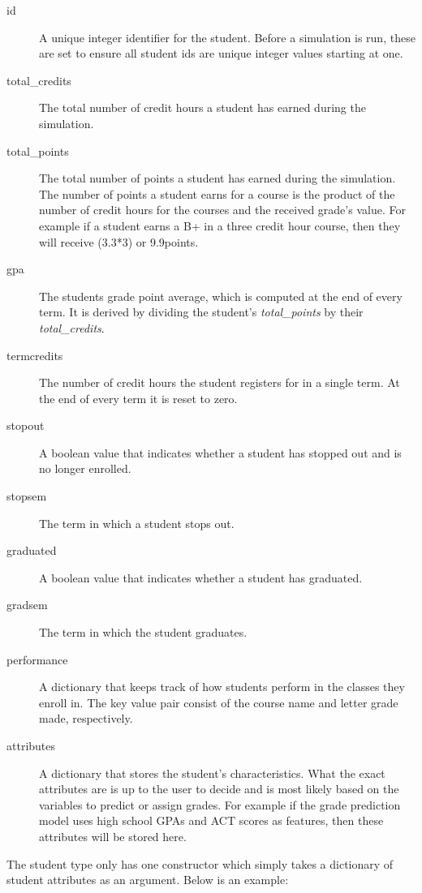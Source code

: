 \documentclass[botnum, fleqn]{unmeethesis}
\begin{document}
    \begin{description}
      \item [id] A unique integer identifier for the student. Before a simulation is run, these are set to ensure all student ids are unique integer values starting at one.
      \item [total\_credits] The total number of credit hours a student has earned during the simulation.
      \item [total\_points] The total number of points a student has earned during the simulation. The number of points a student earns for a course is the product of the number of credit hours for the courses and the received grade's value. For example if a student earns a B+ in a three credit hour course, then they will receive (3.3*3) or 9.9points.
      \item [gpa] The students grade point average, which is computed at the end of every term. It is derived by dividing the student's \textit{total\_points} by their \textit{total\_credits}.
      \item [termcredits] The number of credit hours the student registers for in a single term. At the end of every term it is reset to zero.
      \item [stopout] A boolean value that indicates whether a student has stopped out and is no longer enrolled.
      \item [stopsem] The term in which a student stops out.
      \item [graduated] A boolean value that indicates whether a student has graduated.
      \item [gradsem] The term in which the student graduates.
      \item [performance] A dictionary that keeps track of how students perform in the classes they enroll in. The key value pair consist of the course name and letter grade made, respectively.
      \item [attributes] A dictionary that stores the student's characteristics. What the exact attributes are is up to the user to decide and is most likely based on the variables to predict or assign grades. For example if the grade prediction model uses high school GPAs and ACT scores as features, then these attributes will be stored here.
    \end{description}

    The student type only has one constructor which simply takes a dictionary of student attributes as an argument. Below is an example:
\end{document}
